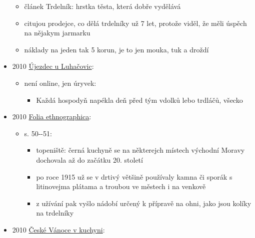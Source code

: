 \begin{itemize}
  \begin{itemize}
  \tightlist
  \item
    článek Trdelník: hrstka těsta, která dobře vydělává
  \item
    citujou prodejce, co dělá trdelníky už 7 let, protože viděl, že měli
    úspěch na nějakym jarmarku
  \item
    náklady na jeden tak 5 korun, je to jen mouka, tuk a droždí
  \end{itemize}
\item
  2010
  \href{https://ceskadigitalniknihovna.cz/uuid/uuid:d23e8f20-80e9-11e7-b92d-005056827e51}{Újezdec
  u Luhačovic}:

  \begin{itemize}
  \tightlist
  \item
    není online, jen úryvek:

    \begin{itemize}
    \tightlist
    \item
      Každá hospodyň napékla deň před tým vdolků lebo trdláčů, všecko
    \end{itemize}
  \end{itemize}
\item
  2010
  \href{https://ndk.cz/uuid/uuid:41ed2580-5e9b-11e4-8b87-001018b5eb5c}{Folia
  ethnographica}:

  \begin{itemize}
  \tightlist
  \item
    s. 50-\/-51:

    \begin{itemize}
    \tightlist
    \item
      topeniště: černá kuchyně se na některejch místech východní Moravy
      dochovala až do začátku 20. století
    \item
      po roce 1915 už se v drtivý většině používaly kamna či sporák s
      litinovejma plátama a troubou ve městech i na venkově
    \item
      z užívání pak vyšlo nádobí určený k přípravě na ohni, jako jsou
      kolíky na trdelníky
    \end{itemize}
  \end{itemize}
\item
  2010
  \href{https://ceskadigitalniknihovna.cz/uuid/uuid:0aef9650-0ddf-11e5-9eb3-005056827e52}{České
  Vánoce v kuchyni}:


\end{itemize}
